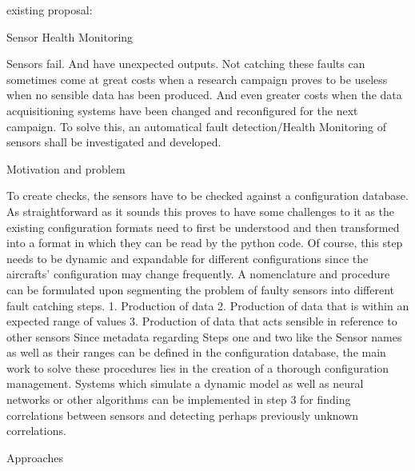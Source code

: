 existing proposal:

Sensor Health Monitoring

Sensors fail. And have unexpected outputs. Not catching these faults can sometimes come at great costs when a research campaign proves to be useless when no sensible data has been produced. And even greater costs when the data acquisitioning systems have been changed and reconfigured for the next campaign.
To solve this, an automatical fault detection/Health Monitoring of sensors shall be investigated and developed.

Motivation and problem

To create checks, the sensors have to be checked against a configuration database. As straightforward as it sounds this proves to have some challenges to it as the existing configuration formats need to first be understood and then transformed into a format in which they can be read by the python code. Of course, this step needs to be dynamic and expandable for different configurations since the aircrafts’ configuration may change frequently.
A nomenclature and procedure can be formulated upon segmenting the problem of faulty sensors into different fault catching steps.
1.	Production of data
2.	Production of data that is within an expected range of values
3.	Production of data that acts sensible in reference to other sensors
Since metadata regarding Steps one and two like the Sensor names as well as their ranges can be defined in the configuration database, the main work to solve these procedures lies in the creation of a thorough configuration management.
Systems which simulate a dynamic model as well as neural networks or other algorithms can be implemented in step 3 for finding correlations between sensors and detecting perhaps previously unknown correlations.

Approaches

